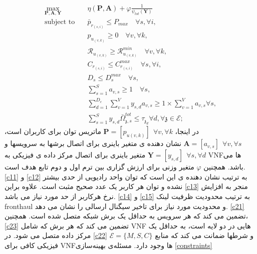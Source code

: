 \begin{subequations}
\begin{alignat}{4}
\max\limits_{\boldsymbol{P}, \boldsymbol{A}, \boldsymbol{Y} }   \quad &  \eta(\boldsymbol{P},\boldsymbol{A})+ \varphi \frac{1}{\psi_{tot}(\boldsymbol{Y})} \\
\text{subject to} \quad  & \bar{p}_{r_{(s,i)}} \leq P_{max} \quad \forall s, \forall i,
 \label{c11} \\
&p_{u_{(v,k)}}  \geq 0  \quad \forall v, \forall k,\label{c12} \\
&\mathcal{R}_{u_{(v,k)}} \geq  \mathcal{R}_{u_{(v,k)}}^{min} \quad \forall v, \forall k,\label{c13} \\
&C_{r_{(s,i)}} \leq C_{r_{(s,i)}}^{max} \quad \forall s, \forall i, \label{c14}\\
&D_{s} \leq D_{s}^{max} \quad \forall s,\label{c15} \\
& \textstyle  \sum_{s=1}^{S}a_{v,s} \geq 1 \quad \forall s, \label{c21} \\
& \textstyle  \sum_{d=1}^{D_c}\sum_{v=1}^{V}y_{s,d}a_{v,s} \geq 1\times\sum_{v=1}^{V}a_{v,s} \forall s,\label{c23} \\
 &\textstyle \sum_{s=1}^{S} y_{s,d} \bar{\Omega}_{\mathfrak{z},s}^{tot}  \leq   \tau_{\mathfrak{z}_d}  \forall d, \forall \mathfrak{z}\in \mathcal{E}; \label{c22}
\end{alignat}
\label{constraints}
\end{subequations}
در اینجا،
$\boldsymbol{P} =[p_{u(v,k)}] \:\: \forall v , \forall k $
ماتریس توان برای کاربران است،
$\boldsymbol{A} =[a_{v,s}] \:\: \forall v , \forall s $
نشان دهنده ی
متغیر باینری برای اتصال برشها به سرویسها و
$\boldsymbol{Y} =[y_{s,d}]  \:\: \forall s ,  \forall d $
متغیر باینری برای اتصال
مرکز داده ی فیزیکی به VNFها می باشد.
همچنین
$\varphi$ 
متغیر وزنی برای ارزش گزاری بین ترم اول و دوم تابع هدف است.
\eqref{c11}
و
\eqref{c12}
به ترتیب
نشان دهنده ی این است که توان واحد رادیویی از حدی بیشتر نشده و توان هر کاربر یک عدد صحیح مثبت است.
علاوه براین
\eqref{c13}
منجر به افزایش نرخ هرکاربر از حد مورد نیاز می باشد.
 \eqref{c14}
  و 
  \eqref{c15}
  به ترتیب
  محدودیت ظرفیت لینک
  fronthaul 
  و محدودیت مورد نیاز برای تاخیر سیگنال ارسالی
  را نشان می دهد.
  \eqref{c21}
 تضمین می کند که هر سرویس
 به حداقل یک
 برش شبکه متصل شده است.
همچنین،
\eqref{c23}
تضمین می کند که هر برش که شامل VNF هایی در دو لایه است،
به حداقل یک مرکز داده متصل می شود.
در \eqref{c22} 
$\mathcal{E} = \{M,S,C\}$ 
و شرطها ضمانت می کند که منابع فیزیکی کافی برای VNFها وجود دارد.\newline
مسئله‌ی بهینه‌سازی \eqref{constraints}
